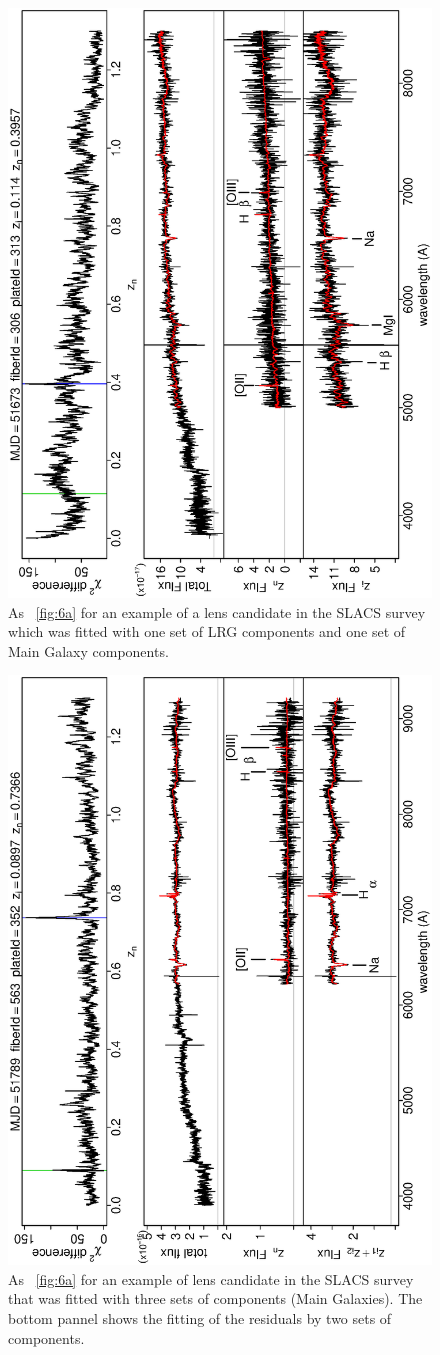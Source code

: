 \documentclass[12pt,preprint]{aastex}
\begin{document}
\clearpage
\begin{figure}
\includegraphics[angle=-90,width=0.49\columnwidth]{paper_plots/paper_6lg}
\caption{As \figurename~\ref{fig:6a} for an example of a lens candidate in the SLACS survey
  which was fitted with one set of LRG components and one set of
  Main Galaxy components.}
\label{fig:7}
\end{figure}

\clearpage
\begin{figure}
\includegraphics[angle=-90,width=0.49\columnwidth]{paper_plots/paper_12ggg}
\caption{As \figurename~\ref{fig:6a} for an example of lens candidate in the SLACS survey
  that was fitted with three sets of components (Main Galaxies).
  The bottom pannel shows the fitting of the residuals by two
  sets of components.}
\label{fig:8}
\end{figure}
\end{document}
